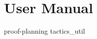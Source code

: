 \def\rcsid{$Id: UserManual.tex,v 1.10 1999/03/31 13:38:02 img Exp $}


\part {User Manual}

 {proof-planning}
 {tactics_util}


